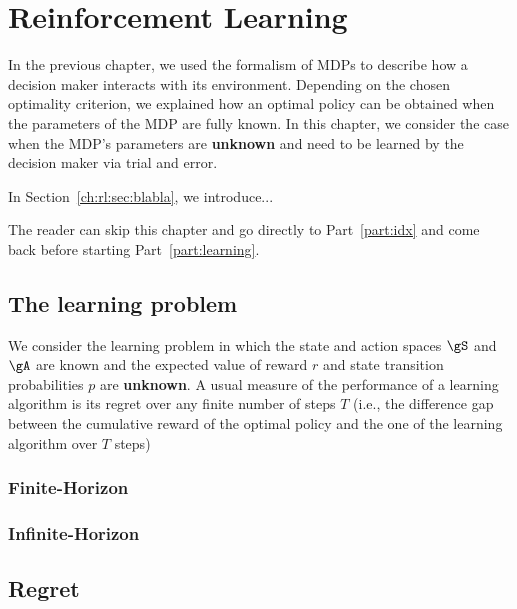 \chapter{Reinforcement Learning}
\label{ch:rl_finite_horizon}

In the previous chapter, we used the formalism of MDPs to describe how a decision maker interacts with its environment.
Depending on the chosen optimality criterion, we explained how an optimal policy can be obtained when the parameters of the MDP are fully known.
In this chapter, we consider the case when the MDP's parameters are \textbf{unknown} and need to be learned by the decision maker via trial and error.

In Section~\ref{ch:rl:sec:blabla}, we introduce...

The reader can skip this chapter and go directly to Part~\ref{part:idx} and come back before starting Part~\ref{part:learning}.

\section{The learning problem}

We consider the learning problem in which the state and action spaces $\gS$ and $\gA$ are known and the expected value of reward $r$ and state transition probabilities $p$ are \textbf{unknown}.
A usual measure of the performance of a learning algorithm is its regret over any finite number of steps $T$ (i.e., the difference gap between the cumulative reward of the optimal policy and the one of the learning algorithm over $T$ steps)

\subsection{Finite-Horizon}


\subsection{Infinite-Horizon}


\section{Regret}
\label{sec:regret}

